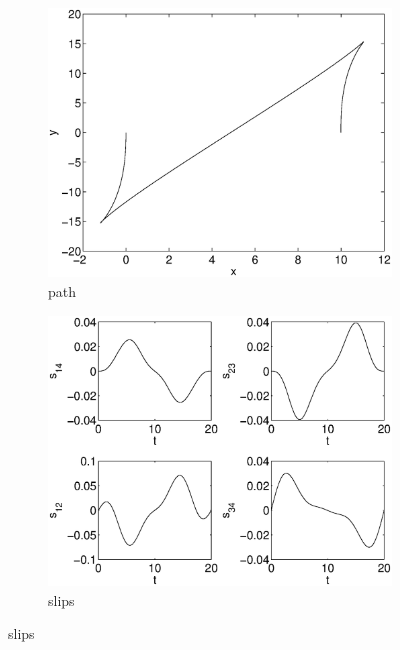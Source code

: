 \begin{figure}[h]
\begin{subfigure}[b]{\textwidth}
\centering
\includegraphics[height=0.3\textheight]{img/final_15_15_20_path.eps}
\caption{path}
\end{subfigure}

\begin{subfigure}[b]{\textwidth}
\centering
\includegraphics[height=0.3\textheight]{img/final_15_15_20_slips.eps}
\caption{slips}
\end{subfigure}


\end{figure}
